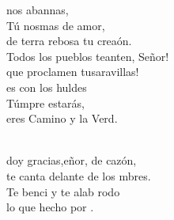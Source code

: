 \documentclass[12pt]{article}
\begin{document}
\begin{multicols*}{2}
\begin{cancion}
	 nos abannas, \\
	Tú nosmas de amor,\\
	de terra rebosa tu creaón.\\
\jump
	Todos los pueblos teanten, Señor!\\
	que proclamen tusaravillas!\\
	es con los huldes \\
	Túmpre estarás,\\
	eres  Camino y la Verd.\\\jump\\
	\begin{chorus}%
	 doy gracias,eñor, de cazón,\\
	te canta delante de los mbres. \\
	Te benci y te alab rodo \\
	lo que  hecho por . \\
	\end{chorus}%
	\jump\\
\end{cancion}%


\end{multicols*}
\end{document}
